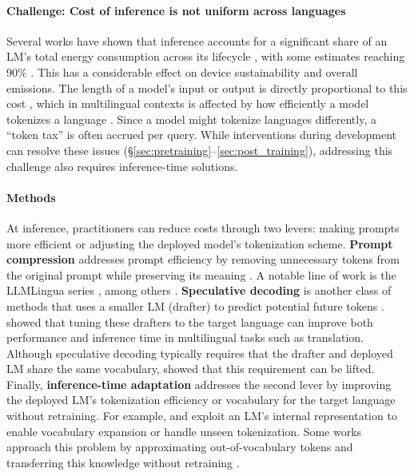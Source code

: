 \documentclass[11pt,a4paper]{article}
\begin{document}
\paragraph{Challenge: Cost of inference \iconenergy{} is not uniform across languages \iconrepresentation{}}
Several works have shown that inference accounts for a significant share of an LM's total energy consumption across its lifecycle \citep[\textit{inter alia}]{fu-etal-2025-llmco2,adamska2025greenprompting}, with some estimates reaching 90\% \citep{hutt2019inferentia}.
This has a considerable effect on device sustainability and overall emissions.
The length of a model's input or output is directly proportional to this cost \citep{jegham2025hungryaibenchmarkingenergy}, which in multilingual contexts is affected by how efficiently a model tokenizes a language \citep{rust-etal-2021-good,ahia2023do,petrov2023language}.
Since a model might tokenize languages differently, a ``token tax'' \citep{lundin-etal-2026-token} is often accrued per query.
While interventions during development can resolve these issues (\S\ref{sec:pretraining}--\ref{sec:post_training}), addressing this challenge also requires inference-time solutions.%


\paragraph{Methods}
At inference, practitioners can reduce costs through two levers: making prompts more efficient or adjusting the deployed model's tokenization scheme.
\textbf{Prompt compression} addresses prompt efficiency by removing unnecessary tokens from the original prompt while preserving its meaning \citep{li-etal-2025-prompt}.
A notable line of work is the LLMLingua series \citep{jiang-etal-2023-llmlingua,pan-etal-2024-llmlingua,jiang-etal-2024-longllmlingua}, among others \citep{li-etal-2023-compressing,chuang-etal-2024-learning}.
\textbf{Speculative decoding} is another class of methods that uses a smaller LM (drafter) to predict potential future tokens \citep{leviathan-etal-2023-fast}.
\citet{yi-etal-2024-towards} showed that tuning these drafters to the target language can improve both performance and inference time in multilingual tasks such as translation.
Although speculative decoding typically requires that the drafter and deployed LM share the same vocabulary, \citet{timor2025accelerating} showed that this requirement can be lifted.
Finally, \textbf{inference-time adaptation} addresses the second lever by improving the deployed LM's tokenization efficiency or vocabulary for the target language without retraining.
For example, \citet{kaplan2025from} and \citet{zheng2025broken} exploit an LM's internal representation to enable vocabulary expansion or handle unseen tokenization.
Some works approach this problem by approximating out-of-vocabulary tokens and transferring this knowledge without retraining \citep[\textit{inter alia}]{goddard2025trainingfreetokenizertransplantationorthogonal}.
\end{document}
